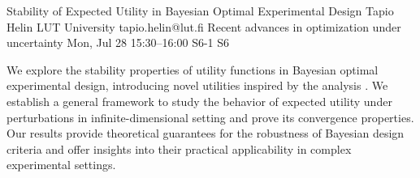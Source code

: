 \begin{talk}
  {Stability of Expected Utility in Bayesian Optimal Experimental Design}%
  {Tapio Helin}%
  {LUT University}%
  {tapio.helin@lut.fi}%
  {Recent advances in optimization under uncertainty}%
  {}%
  {Mon, Jul 28 15:30–16:00}%
  {S6-1}%
  {S6}%
				
			
We explore the stability properties of utility functions in Bayesian optimal experimental design, introducing novel utilities inspired by the analysis . We establish a general framework to study the behavior of expected utility under perturbations in infinite-dimensional setting and prove its convergence properties. Our results provide theoretical guarantees for the robustness of Bayesian design criteria and offer insights into their practical applicability in complex experimental settings.

\medskip

%
\end{talk}

